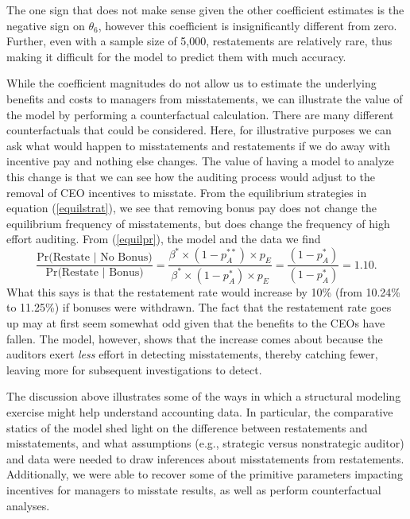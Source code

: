 The one sign that does not make sense given the other coefficient estimates is the negative sign on $\theta_6$, however this coefficient is insignificantly different from zero.
Further, even with a sample size of 5,000, restatements are relatively rare, thus making it difficult for the model to predict them with much accuracy. 

While the coefficient magnitudes do not allow us to estimate the underlying benefits and costs to managers from misstatements, we can illustrate the value of the model by performing a counterfactual calculation.
There are many different counterfactuals that could be considered. 
Here, for illustrative purposes we can ask what would happen to misstatements and restatements if we  do away with incentive pay and nothing else changes.
The value of having a model to analyze this change is that we can see how the auditing process would adjust to the removal of CEO incentives to misstate. 
From the equilibrium strategies in equation (\ref{equilstrat}), we see that removing bonus pay does not change the equilibrium frequency of misstatements, but does change the frequency of high effort auditing.
From (\ref{equilpr}), the model and the data we find
$$ \dfrac{\mbox{Pr(Restate }\vert \mbox{ No Bonus)}}{\mbox{Pr(Restate }\vert \mbox{ Bonus)}}=\dfrac{\beta^* \times (1-p_A^{**}) \times p_{E}}
{\beta^* \times (1-p_A^{*}) \times p_{E}} = \dfrac{(1-p_A^*)}{(1-p_A^*)} = 1.10.$$
What this says is that the restatement rate would increase by 10\% (from 10.24\% to 11.25\%) if bonuses
were withdrawn. 
The fact that the restatement rate goes up may at first seem somewhat odd given that the benefits to the CEOs have fallen. 
The model, however, shows that the increase  comes about because the auditors exert \emph{less} effort in detecting misstatements, thereby catching fewer, leaving more for subsequent investigations to detect.

The discussion above illustrates some of the ways in which a structural modeling exercise might help understand accounting data. 
In particular, the comparative statics of the model shed light on the difference between restatements and misstatements, and what assumptions (e.g., strategic versus nonstrategic auditor) and data were needed to draw  inferences about misstatements from restatements. 
Additionally, we were able to recover some of the primitive parameters impacting incentives for managers to misstate results, as well as perform counterfactual analyses.

